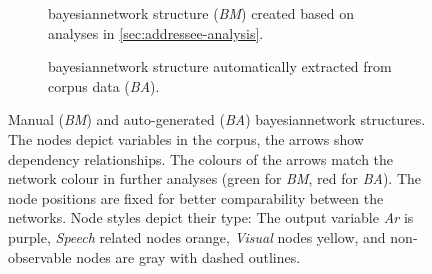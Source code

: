 \begin{figure}[tbh]
  \begin{subfigure}[b]{\textwidth}
    \centering
    \def\svgwidth{1.0\textwidth}
    {\footnotesize
    
    }
    \caption[\emph{Hand-crafted} Bayesian Network-structure for addressee recognition.]{\label{fig:study-addresse-model-bn-manual}
    \gls{bayesiannetwork} structure (\emph{BM}) created based on analyses in \cref{sec:addressee-analysis}.
    }
  \end{subfigure}
  \begin{subfigure}[b]{\textwidth}
    \centering
    \def\svgwidth{1.0\textwidth}
    {\footnotesize
    
    }
    \caption[Auto-generated Bayesian Network-structure for addressee recognition.]{\label{fig:study-addresse-model-bn-auto} 
    \gls{bayesiannetwork} structure automatically extracted from corpus data (\emph{BA}).
    }
  \end{subfigure}
    \caption[Addressee recognition model \emph{Manual} \& \emph{Auto}.]{\label{fig:study-addresse-model-bn-manauto} 
    Manual (\emph{BM}) and auto-generated (\emph{BA}) \gls{bayesiannetwork} structures.
    The nodes depict variables in the corpus, the arrows show dependency relationships.
    The colours of the arrows match the network colour in further analyses (green for \emph{BM}, red for \emph{BA}).
    The node positions are fixed for better comparability between the networks.
    Node styles depict their type:
    The output variable \emph{Ar} is purple, \emph{Speech} related nodes orange, \emph{Visual} nodes yellow, and non-observable nodes are gray with dashed outlines.
    }
\end{figure}

